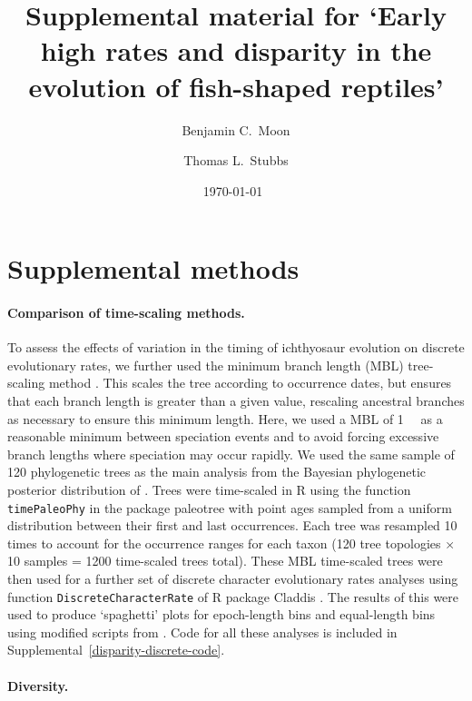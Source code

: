 \documentclass[british,a4paper]{article}
\title{Supplemental material for ‘Early high rates and disparity in the evolution of fish-shaped reptiles’}
\author{Benjamin C.\ Moon \and Thomas L.\ Stubbs}
\date{\today~\version}
\begin{document}
\maketitle

\tableofcontents

\section{Supplemental methods}\label{supplemental-methods}

\paragraph{Comparison of time-scaling methods.}
\label{comparison-of-time-scaling-methods}

To assess the effects of variation in the timing of ichthyosaur evolution on discrete evolutionary rates, we further used the minimum branch length (MBL) tree-scaling method \autocite{Bapst2012, Laurin2004SystBiol}. This scales the tree according to occurrence dates, but ensures that each branch length is greater than a given value, rescaling ancestral branches as necessary to ensure this minimum length. Here, we used a MBL of \SI{1}{\mega\annum} as a reasonable minimum between speciation events and to avoid forcing excessive branch lengths where speciation may occur rapidly. We used the same sample of 120 phylogenetic trees as the main analysis from the Bayesian phylogenetic posterior distribution of \textcite{Moon2019a}. Trees were time-scaled in R \autocite{R} using the function \texttt{timePaleoPhy} in the package paleotree \autocite{Bapst2012} with point ages sampled from a uniform distribution between their first and last occurrences. Each tree was resampled 10 times to account for the occurrence ranges for each taxon (120 tree topologies × 10 samples = 1200 time-scaled trees total). These MBL time-scaled trees were then used for a further set of discrete character evolutionary rates analyses using function \texttt{DiscreteCharacterRate} of R package Claddis \autocite{Lloyd2016}. The results of this were used to produce `spaghetti' plots for epoch-length bins and equal-length bins using modified scripts from \textcite{Close2015a}. Code for all these analyses is included in Supplemental~\ref{disparity-discrete-code}.

\paragraph{Diversity.}\label{diversity}
\end{document}
